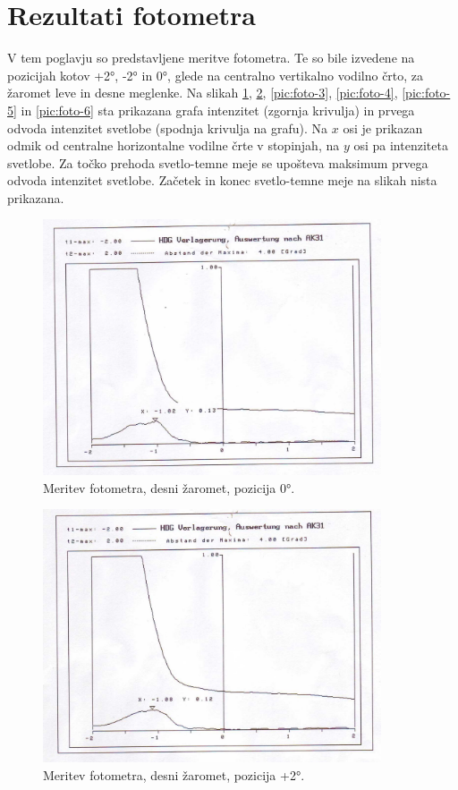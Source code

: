 \documentclass[oneside, a4paper, 12pt]{book}
\begin{document}
\section{Rezultati fotometra}
\label{ch:rf}
V tem poglavju so predstavljene meritve fotometra. Te so bile izvedene na pozicijah kotov +2°, -2° in 0°, glede na centralno vertikalno vodilno črto, za žaromet leve in desne meglenke. Na slikah \ref{pic:foto-1}, \ref{pic:foto-2}, \ref{pic:foto-3}, \ref{pic:foto-4}, \ref{pic:foto-5} in \ref{pic:foto-6} sta prikazana grafa intenzitet (zgornja krivulja) in prvega odvoda intenzitet svetlobe (spodnja krivulja na grafu). Na $x$ osi je prikazan odmik od centralne horizontalne vodilne črte v stopinjah, na $y$ osi pa intenziteta svetlobe. Za točko prehoda svetlo-temne meje se upošteva maksimum prvega odvoda intenzitet svetlobe. Začetek in konec svetlo-temne meje na slikah nista prikazana.
\begin{figure}
\begin{center}
\includegraphics[width=10cm]{slike/fotometer-desni-0.jpg}
\end{center}
\caption{Meritev fotometra, desni žaromet, pozicija 0°.}
\label{pic:foto-1}
\end{figure}

\begin{figure}
\begin{center}
\includegraphics[width=10cm]{slike/fotometer-desni-+2.jpg}
\end{center}
\caption{Meritev fotometra, desni žaromet, pozicija +2°.}
\label{pic:foto-2}
\end{figure}
\end{document}
